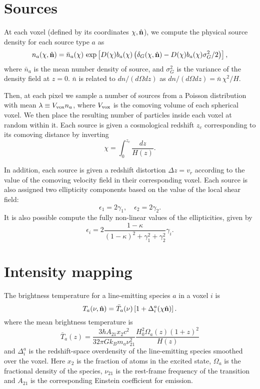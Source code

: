 \documentclass[a4paper,10pt]{article}
\newcommand{\nv}{\hat{\bf n}}
\begin{document}
\section{Sources}
  At each voxel (defined by its coordinates $\chi,\nv$), we compute the physical source
  density for each source type $a$ as
  \begin{equation}
    n_a(\chi,\hat{\bf n})=
    \bar{n}_a(\chi)\,
    \exp\left[D(\chi)b_a(\chi)\left(\delta_G(\chi,\hat{\bf n})-
      D(\chi)b_a(\chi)\sigma_G^2/2\right)\right],
  \end{equation}
  where $\bar{n}_a$ is the mean number density of source, and $\sigma_G^2$
  is the variance of the density field at $z=0$. $\bar{n}$ is related to
  $dn/(d\Omega dz)$ as $dn/(d\Omega dz)=\bar{n}\,\chi^2/H$.

  Then, at each pixel we sample a number of sources from a Poisson distribution with mean
  $\lambda\equiv V_{\rm vox}n_a$, where $V_{\rm vox}$ is the comoving volume of each
  spherical voxel. We then place the resulting number of particles inside each voxel at
  random within it. Each source is given a cosmological redshift $z_c$
  corresponding to its comoving distance by inverting
  \begin{equation}
    \chi=\int_0^{z_c}\frac{dz}{H(z)}.
  \end{equation}

  In addition, each source is given a redshift distortion $\Delta z=v_r$ according to the
  value of the comoving velocity field in their corresponding voxel. Each source is also
  assigned two ellipticity components based on the value of the local shear field:
  \begin{equation}
    \epsilon_1=2\gamma_1,\hspace{12pt}\epsilon_2=2\gamma_2.
  \end{equation}
  It is also possible compute the fully non-linear values of the ellipticities, given by
  \begin{equation}
    \epsilon_i=2\frac{1-\kappa}{(1-\kappa)^2+\gamma_1^2+\gamma_2^2}\gamma_i.
  \end{equation}

\section{Intensity mapping}
  The brightness temperature for a line-emitting species $a$ in a voxel $i$ is
  \begin{equation}
    T_a(\nu,\hat{\bf n})=\bar{T}_a(\nu)\left[1+\Delta^a_i(\chi\hat{\bf n})\right].
  \end{equation}
  where the mean brightness temperature is
  \begin{equation}
    \bar{T}_a(z)=\frac{3\hbar A_{21} x_2 c^2}{32\pi G k_B m_a \nu_{21}^2}
    \frac{H_0^2\Omega_{a}(z)(1+z)^2}{H(z)}
  \end{equation}
  and $\Delta^a_i$ is the redshift-space overdensity of the line-emitting species
  smoothed over the voxel. Here $x_2$ is the fraction of atoms in the excited state,
  $\Omega_a$ is the fractional density of the species, $\nu_{21}$ is the rest-frame
  frequency of the transition and $A_{21}$ is the corresponding Einstein coefficient
  for emission.
\end{document}

